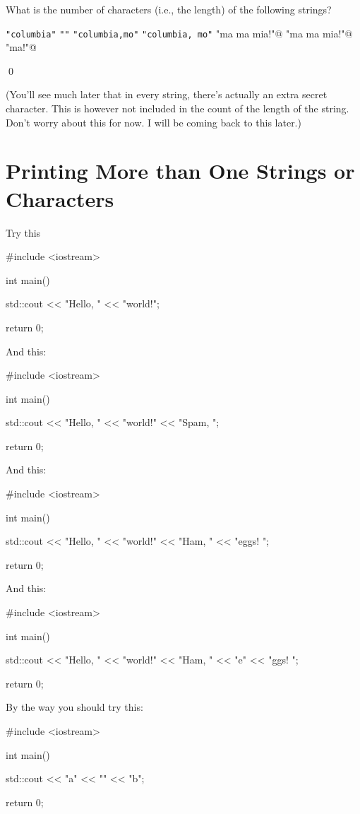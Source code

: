 \begin{ex}
What is the number of characters (i.e., the length) of the following strings?
\begin{tightlist}
\li \verb!"columbia"!
\li \verb!""!
\li \verb!"columbia,mo"!
\li \verb!"columbia, mo"!
\li \verb@"ma ma mia!"@
\li \verb@"ma ma mia!\n"@
\li \verb@"ma\tma\tmia!\n\n"@
\end{tightlist}
\qed
\end{ex}


(You'll see much later that in every string, there's actually an extra secret character. This is however not included in the count of the length of the string. Don't worry about this for now. I will be coming back to this later.)









\newpage\section{Printing More than One Strings or Characters}

Try this
\begin{console}
#include <iostream>

int main()
{
    std::cout << "Hello, " << "world!\n";

    return 0;
}
\end{console}
And this:
\begin{console}
#include <iostream>

int main()
{
	std::cout << "Hello, " << "world!\n"
                  << "Spam, \n";

	return 0;
}
\end{console}
And this:
\begin{console}
#include <iostream>

int main()
{
	std::cout << "Hello, " << "world!\n"
                  << "Ham, " << "eggs! \n";

	return 0;
}
\end{console}
And this:
\begin{console}
#include <iostream>

int main()
{
	std::cout << "Hello, " << "world!\n"
                  << "Ham, " << "e" << "ggs! \n";

	return 0;
}
\end{console}

By the way you should try this:
\begin{console}
#include <iostream>

int main()
{
    std::cout << "a" << "" << "b";

    return 0;
}
\end{console}

